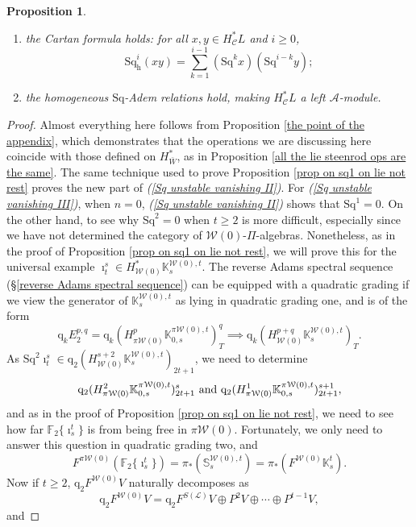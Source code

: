 \documentclass[11pt]{amsart} \renewcommand{\baselinestretch}{1.2}
\theoremstyle{plain}
\newtheorem{prop}[thm]{Proposition}
\theoremstyle{definition}
\newcommand{\scrL}{\mathscr{L}}
\newcommand{\calA}{\mathcal{A}}
\newcommand{\calw}{\mathcal{W}}
\newcommand{\calc}{\mathcal{C}}
\newcommand{\LieOperad}{{\scrL}}
\newcommand{\PA}[1]{\pi#1}
\newcommand{\quadgrad}[1]{\mathrm{q}_{#1}}
\newcommand{\Sq}{\mathrm{Sq}}
\newcommand{\LieSteen}{\calA}
\newcommand{\F}{\mathbb{F}}
\newcommand{\Ftwo}{\F_2}
\newcommand{\dhor}{_\mathrm{h}}
\newcommand{\Sqh}{\mathrm{Sq}\dhor}
\begin{document}
\begin{Cohomology Operations for W and U}
\begin{prop}
\begin{enumerate}
\item the \emph{Cartan formula} holds:  for all $x,y\in   H^*_{\calc}L$ and $i\geq0$,
\[\Sqh^i(xy)=\textstyle\sum_{k=1}^{i-1}(\Sq^kx)(\Sq^{i-k}y);\]
\item \label{yeah H is a Stmodule II} the  homogeneous $\Sq$-Adem relations hold, making $H^{*}_\calc L$ a left $\LieSteen$-module.
\end{enumerate}
\end{prop}
\begin{proof}
Almost everything here follows from Proposition \ref{the point of the appendix}, which demonstrates that the operations we are discussing here coincide with those defined on $H^*_{\bar{W}}$, as in Proposition \ref{all the lie steenrod ops are the same}. The same technique used to prove Proposition \ref{prop on sq1 on lie not rest} proves the new part of \emph{(\ref{Sq unstable vanishing II})}. For \emph{(\ref{Sq unstable vanishing III})},  when $n=0$, \emph{(\ref{Sq unstable vanishing II})} shows that $\Sq^1=0$. On the other hand, to see why $\Sq^2=0$ when $t\geq2$ is more difficult, especially since we have not determined the category of $\calw(0)$-$\Pi$-algebras. Nonetheless, as in the proof of Proposition \ref{prop on sq1 on lie not rest}, we will prove this for the universal example $\imath^s_t\in H^*_{\calw(0)}\mathbb{K}_s^{\calw(0),t}$. The reverse Adams spectral sequence (\S\ref{reverse Adams spectral sequence}) can be equipped with a quadratic grading if we view the generator of $\mathbb{K}_s^{\calw(0),t}$ as lying in quadratic grading one, and is of the form
\[\quadgrad{k}E_2^{p,q}=\quadgrad{k}(H^{p}_{\PA{\calw(0)}}\mathbb{K}_{0,s}^{\PA{\calw(0)},t})^{q}_{T}\implies \quadgrad{k}(H^{p+q}_{\calw(0)}\mathbb{K}_s^{\calw(0),t})_T.\]
As $\Sq^2\imath_t^s\in \quadgrad{2}(H^{s+2}_{\calw(0)}\mathbb{K}_s^{\calw(0),t})_{2t+1}$, we need to determine
\[
\quadgrad{2}(H^{2}_{\PA{\calw(0)}}\mathbb{K}_{0,s}^{\PA{\calw(0)},t})^{s}_{2t+1}\textup{ and }
\quadgrad{2}(H^{1}_{\PA{\calw(0)}}\mathbb{K}_{0,s}^{\PA{\calw(0)},t})^{s+1}_{2t+1},
\] 
and as in the proof of Proposition \ref{prop on sq1 on lie not rest}, we need to see how far $\Ftwo\{\imath^t_s\}$ is from being free in $\PA{\calw(0)}$. Fortunately, we only need to answer this question in quadratic grading two, and 
\[F^{\PA{\calw(0)}}(\Ftwo\{\imath^t_s\})=\pi_*(\mathbb{S}_s^{\calw(0),t})=\pi_*(F^{\calw(0)} \mathbb{K}^{t}_s).\]
Now if $t\geq2$, $\quadgrad{2}F^{\calw(0)}V$ naturally decomposes as 
\[\quadgrad{2}F^{\calw(0)}V=\quadgrad{2}F^{S(\LieOperad)}V\oplus P^2V\oplus\cdots \oplus P^{t-1}V,\]
and

\end{proof}
\end{Cohomology Operations for W and U}
\end{document}
